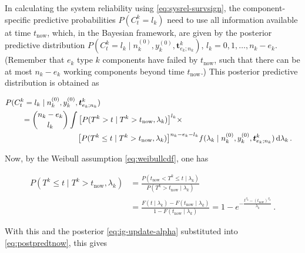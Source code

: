 \documentclass[Journal,SectionNumbers,InsideFigs]{ascelike}
\newcommand{\dd}{\,\mathrm{d}}
\renewcommand{\vec}[1]{{\bm#1}}
\newcommand{\uz}{^{(0)}} %
\def\ykz{y\uz_k}
\def\nkz{n\uz_k}
\def\tnow{t_\text{now}}
\begin{document}
In calculating the system reliability using \eqref{eq:sysrel-survsign},
the component-specific predictive probabilities $P(C^k_t = l_k)$
need to use all information available at time $\tnow$,
which, in the Bayesian framework,
are given by the posterior predictive distribution 
$P(C^k_t = l_k\mid\nkz,\ykz, \vec{t}^k_{e_k;n_k})$, $l_k = 0, 1, \ldots, n_k-e_k$. %
(Remember that $e_k$ type $k$ components have failed by $\tnow$,
such that there can be at most $n_k-e_k$ working components beyond time $\tnow$.)
This posterior predictive distribution is obtained as
\begin{linenomath*}
\begin{align}
\lefteqn{%
P(C^k_t = l_k\mid\nkz,\ykz, \vec{t}^k_{e_k;n_k})}\hspace*{5ex} \nonumber\\  %
 &= { n_k - e_k \choose l_k} \int \big[P(T^k >    t \mid T^k > \tnow, \lambda_k)\big]^{l_k} \times \nonumber\\ & \hspace*{17ex}
                                  \big[P(T^k \leq t \mid T^k > \tnow, \lambda_k)\big]^{n_k - e_k - l_k}
    f(\lambda_k\mid\nkz,\ykz,\vec{t}^k_{e_k;n_k}) \dd \lambda_k\,.
\label{eq:postpredtnow}
\end{align}
\end{linenomath*}
%
Now, by the Weibull assumption \eqref{eq:weibullcdf}, one has
\begin{linenomath*}
\begin{align}
P(T^k \leq t \mid T^k > \tnow, \lambda_k)
 &= \frac{P(\tnow < T^k \leq t \mid\lambda_k)}{P(T^k > \tnow \mid \lambda_k)} \nonumber\\
 &= \frac{F(t\mid\lambda_k) - F(\tnow\mid\lambda_k)}{1-F(\tnow\mid\lambda_k)} 
  = 1 - e^{-\frac{t^{\beta_k} - (\tnow)^{\beta_k}}{\lambda_k}}\,.
\end{align}
\end{linenomath*}
%
With this and the posterior \eqref{eq:ig-update-alpha} substituted into \eqref{eq:postpredtnow}, this gives
\end{document}
